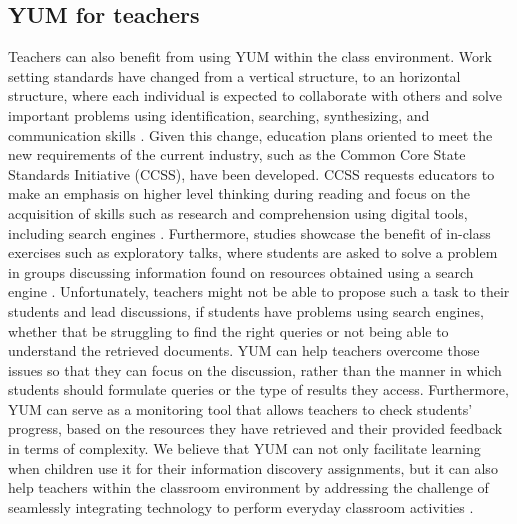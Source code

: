 \documentclass{sig-alternate-05-2015}
\begin{document}
\vspace{-0.0cm}
\subsection{YUM for teachers}
\label{sec:teachers}
Teachers can also benefit from using YUM within the class environment. Work setting standards have changed from a vertical structure,
to an horizontal structure, where each individual is expected to collaborate with others and solve important problems using identification, searching, synthesizing, and communication skills \cite{leu13}. Given this change, education plans oriented to meet the new requirements of the current industry, such as the Common Core State Standards Initiative (CCSS), have been developed. CCSS requests educators to make an emphasis on higher level thinking during reading and focus on the acquisition of skills such as research and comprehension using digital tools, including search engines \cite{leu13}. Furthermore, studies  showcase the benefit of in-class exercises such as  exploratory talks, where students are asked to solve a problem in groups discussing information found on resources obtained using a search engine \cite{kni15}. Unfortunately, teachers might not be able to propose such a task to their students and lead discussions, if students have problems using search engines, whether that be struggling to  find the right queries or not being able to  understand the retrieved documents. YUM can help teachers overcome those issues so that they can focus on the discussion, rather than the manner in which students should formulate queries or the type of results they access. Furthermore, YUM can serve as a monitoring tool that allows teachers to check students' progress, based on the resources they have retrieved and their provided feedback in terms of complexity. We believe that  YUM can  not only facilitate learning when children use it for their information discovery assignments, but it can also help teachers within the classroom environment by  addressing the challenge of seamlessly integrating technology to perform everyday classroom activities \cite{Dan13,kni15}.
\end{document}
